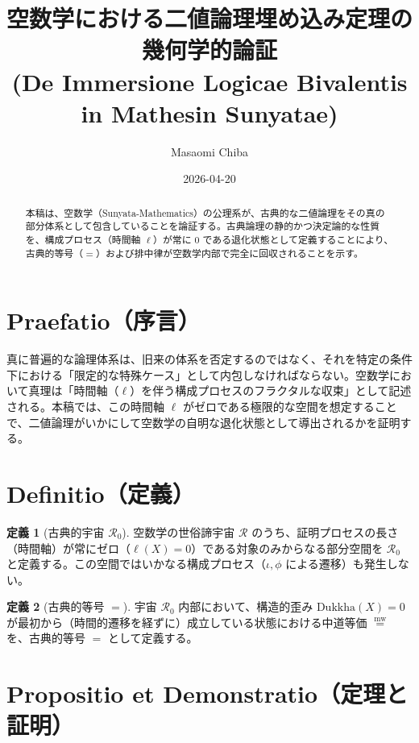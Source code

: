 \documentclass[11pt,a4paper]{article}
\newcommand{\mweq}{\mathrel{\overset{\mathrm{mw}}{=}}}
\newcommand{\Dukkha}{\mathrm{Dukkha}}
\newcommand{\Rep}{\mathcal{R}}
\theoremstyle{definition}
\newtheorem{definition}{定義}[section]
\begin{document}
\title{空数学における二値論理埋め込み定理の幾何学的論証\\
(De Immersione Logicae Bivalentis in Mathesin Sunyatae)}
\author{Masaomi Chiba}
\date{2026-04-20}
\maketitle

\begin{abstract}
本稿は、空数学（Sunyata-Mathematics）の公理系が、古典的な二値論理をその真の部分体系として包含していることを論証する。古典論理の静的かつ決定論的な性質を、構成プロセス（時間軸 $\ell$）が常に $0$ である退化状態として定義することにより、古典的等号（$=$）および排中律が空数学内部で完全に回収されることを示す。
\end{abstract}

\section*{Praefatio（序言）}
真に普遍的な論理体系は、旧来の体系を否定するのではなく、それを特定の条件下における「限定的な特殊ケース」として内包しなければならない。空数学において真理は「時間軸（$\ell$）を伴う構成プロセスのフラクタルな収束」として記述される。本稿では、この時間軸 $\ell$ がゼロである極限的な空間を想定することで、二値論理がいかにして空数学の自明な退化状態として導出されるかを証明する。

\section{Definitio（定義）}

\begin{definition}[古典的宇宙 $\Rep_0$]
空数学の世俗諦宇宙 $\Rep$ のうち、証明プロセスの長さ（時間軸）が常にゼロ（$\ell(X) = 0$）である対象のみからなる部分空間を $\Rep_0$ と定義する。この空間ではいかなる構成プロセス（$\iota, \phi$ による遷移）も発生しない。
\end{definition}

\begin{definition}[古典的等号 $=$]
宇宙 $\Rep_0$ 内部において、構造的歪み $\Dukkha(X) = 0$ が最初から（時間的遷移を経ずに）成立している状態における中道等価 $\mweq$ を、古典的等号 $=$ として定義する。
\end{definition}

\section{Propositio et Demonstratio（定理と証明）}
\end{document}

